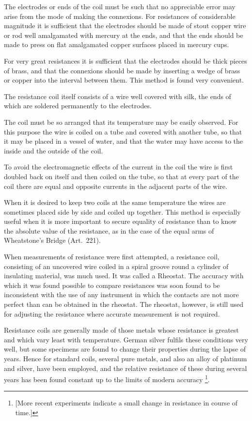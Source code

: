 \documentclass[12pt,oneside]{book}[2021/10/04]
\let\oldfootnote\footnote
\renewcommand\footnote[1]{%
\oldfootnote{\hspace{0.14em}#1}}
\newcommand{\Runhead}[1]{\fancyhead[C]{\iffloatpage{}{\small#1}}}
\newcommand{\¬}{\hphantom{0}}
\begin{document}
The electrodes or ends of the coil must be such that no appreciable
error may arise from the mode of making the connexions.
For resistances of considerable magnitude it is sufficient that the
electrodes should be made of stout copper wire or rod well amalgamated
with mercury at the ends, and that the ends should be
made to press on flat amalgamated copper surfaces placed in
mercury cups.
\Runhead{FORMS OF RESISTANCE COILS.}

For very great resistances it is sufficient that the electrodes
should be thick pieces of brass, and that the connexions should
be made by inserting a wedge of brass or copper into the interval
between them. This method is found very convenient.

The resistance coil itself consists of a wire well covered with
silk, the ends of which are soldered permanently to the electrodes.

The coil must be so arranged that its temperature may be easily
observed. For this purpose the wire is coiled on a tube and
covered with another tube, so that it may be placed in a vessel
of water, and that the water may have access to the inside and the
outside of the coil.

To avoid the electromagnetic effects of the current in the coil
the wire is first doubled back on itself and then coiled on the tube,
so that at every part of the coil there are equal and opposite
currents in the adjacent parts of the wire.

When it is desired to keep two coils at the same temperature the
wires are sometimes placed side by side and coiled up together.
This method is especially useful when it is more important to
secure equality of resistance than to know the absolute value of
the resistance, as in the case of the equal arms of Wheatstone's
Bridge (Art.\ 221).

When measurements of resistance were first attempted, a resistance
coil, consisting of an uncovered wire coiled in a spiral groove
round a cylinder of insulating material, was much used. It was
called a Rheostat. The accuracy with which it was found possible
to compare resistances was soon found to be inconsistent with the
use of any instrument in which the contacts are not more perfect
than can be obtained in the rheostat. The rheostat, however, is
still used for adjusting the resistance where accurate measurement
is not required.

Resistance coils are generally made of those metals whose resistance
is greatest and which vary least with temperature. German
silver fulfils these conditions very well, but some specimens are
found to change their properties during the lapse of years. Hence
for standard coils, several pure metals, and also an alloy of platinum
and silver, have been employed, and the relative resistance of these
during several years has been found constant up to the limits of
modern accuracy\footnote{
[More recent experiments indicate a small change in resistance in course of time.]}.
\end{document}
